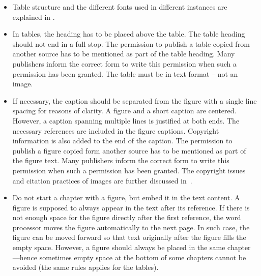 \begin{itemize}
    \setlength\itemsep{0pt}
    \setlength\parskip{0pt}
  \item Table structure and the different fonts used in different
    instances are explained in .
  \item In tables, the heading has to be placed above the table. The
    table heading should not end in a full stop. The permission to
    publish a table copied from another source has to be mentioned as
    part of the table heading. Many publishers inform the correct
    form to write this permission when such a permission has been
    granted. The table must be in text format – not an image.
  \item If necessary, the caption should be separated from the figure
    with a single line spacing for reasons of clarity. A figure and a
    short caption are centered. However, a caption spanning multiple
    lines is justified at both ends. The necessary references are
    included in the figure captions. Copyright information is also
    added to the end of the caption. The permission to publish a
    figure copied form another source has to be mentioned as part of
    the figure text. Many publishers inform the correct form to write
    this permission when such a permission has been granted.  The
    copyright issues and citation practices of images are further
    discussed in~.
  \item Do not start a chapter with a figure, but embed it in the
    text content. A figure is supposed to always appear in the text
    after its reference. If there is not enough space for the figure
    directly after the first reference, the word processor moves the
    figure automatically to the next page. In such case, the figure
    can be moved forward so that text originally after the figure
    fills the empty space. However, a figure should always be placed
    in the same chapter---hence sometimes empty space at the bottom
    of some chapters cannot be avoided (the same rules applies for the tables).
\end{itemize}

